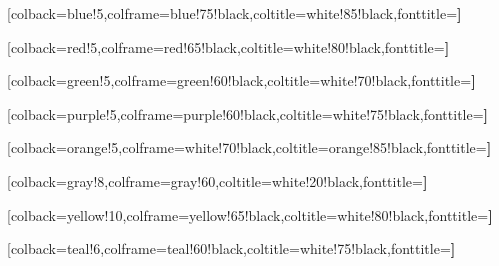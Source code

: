 \usepackage{listings}
\renewcommand{\lstlistingname}{Scripts}%
\renewcommand{\lstlistlistingname}{Lista de \lstlistingname }%


\lstset{style=mystyle}

\usepackage{coloredtheorem}
%
[colback=blue!5,colframe=blue!75!black,coltitle=white!85!black,fonttitle=\bfseries]

[colback=red!5,colframe=red!65!black,coltitle=white!80!black,fonttitle=\bfseries]

[colback=green!5,colframe=green!60!black,coltitle=white!70!black,fonttitle=\bfseries]

[colback=purple!5,colframe=purple!60!black,coltitle=white!75!black,fonttitle=\bfseries]

[colback=orange!5,colframe=white!70!black,coltitle=orange!85!black,fonttitle=\bfseries]

[colback=gray!8,colframe=gray!60,coltitle=white!20!black,fonttitle=\bfseries]

[colback=yellow!10,colframe=yellow!65!black,coltitle=white!80!black,fonttitle=\bfseries]

[colback=teal!6,colframe=teal!60!black,coltitle=white!75!black,fonttitle=\bfseries]

\let\theorem     \cthteorema
\let\endtheorem  \endcthteorema
\let\definition  \cthdefinicion
\let\enddefinition\endcthdefinicion
\let\corollary   \cthcorolario
\let\endcorollary\endcthcorolario
\let\lemma       \cthlema
\let\endlemma    \endcthlema
\let\proposition \cthproposicion
\let\endproposition\endcthproposicion
\let\example     \cthejemplo
\let\endexample  \endcthejemplo
\let\remark      \cthnota
\let\endremark   \endcthnota